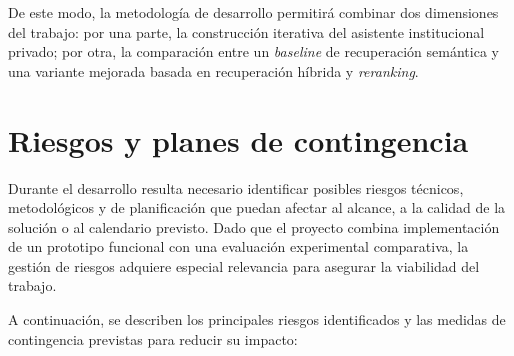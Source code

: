 De este modo, la metodología de desarrollo permitirá combinar dos dimensiones del trabajo: por una parte, la construcción iterativa del asistente institucional privado; por otra, la comparación entre un \textit{baseline} de recuperación semántica y una variante mejorada basada en recuperación híbrida y \textit{reranking}. 

\section{Riesgos y planes de contingencia}\label{sec:riesgos}

Durante el desarrollo resulta necesario identificar posibles riesgos técnicos, metodológicos y de planificación que puedan afectar al alcance, a la calidad de la solución o al calendario previsto. 
Dado que el proyecto combina implementación de un prototipo funcional con una evaluación experimental comparativa, la gestión de riesgos adquiere especial relevancia para asegurar la viabilidad del trabajo.

A continuación, se describen los principales riesgos identificados y las medidas de contingencia previstas para reducir su impacto:

